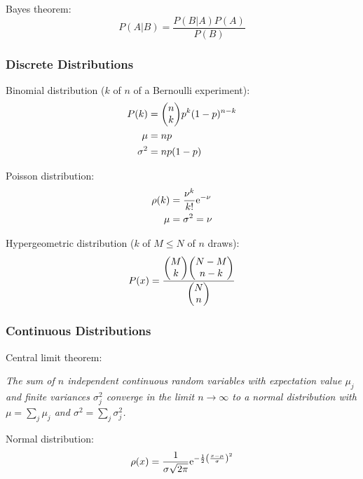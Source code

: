 			\noindent
			Bayes theorem:
			\begin{equation}
				P(A|B) = \frac{P(B|A)P(A)}{P(B)}
			\end{equation}

		\subsubsection{Discrete Distributions}
			\noindent
			Binomial distribution ($k$ of $n$ of a Bernoulli experiment):
			\begin{equation}
				\begin{aligned}
					P(k)&=\binomkoeff{n}{k}p^k(1-p)^{n-k} \\
					\mu &= np \\
					\sigma^2 &= np(1-p)
				\end{aligned}
			\end{equation}

			\noindent
			Poisson distribution:
			\begin{equation}
				\begin{aligned}
					\rho(k) &= \frac{\nu^k}{k!} \mathrm{e}^{-\nu} \\
					\mu &= \sigma^2 = \nu
				\end{aligned}
			\end{equation}

			\noindent
			Hypergeometric distribution ($k$ of $M\le N$ of $n$ draws):
			\begin{equation}
				P(x)=\frac{\binomkoeff{M}{k}\binomkoeff{N-M}{n-k}}{\binomkoeff{N}{n}}
			\end{equation}

		\subsubsection{Continuous Distributions}
			\noindent
			Central limit theorem: \par
				\emph{The sum of $n$ independent continuous random variables with expectation value $\mu_j$ and finite variances $\sigma_j^2$ converge in the limit $n\rightarrow \infty$ to a normal distribution with $\mu = \sum_j \mu_j$ and $\sigma^2 = \sum_j \sigma_j^2$.} \vsp

			\noindent
			Normal distribution:
			\begin{equation}
				\rho(x)=\frac{1}{\sigma\sqrt{2\pi}}\mathrm{e}^{-\frac{1}{2}\left(\frac{x-\mu}{\sigma}\right)^2}
			\end{equation}

